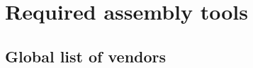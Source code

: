 \section{Required assembly tools}
\label{sec:required-assembly-tools}

\subsection{Global list of vendors}
\label{sec:global-list-of-vendors}